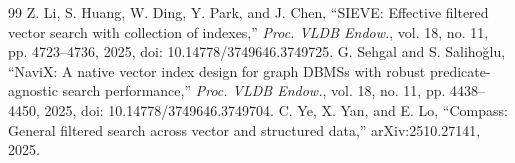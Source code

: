 \documentclass[conference]{IEEEtran}
\begin{document}
\begin{thebibliography}{99}
 Z. Li, S. Huang, W. Ding, Y. Park, and J. Chen, ``SIEVE: Effective filtered vector search with collection of indexes,'' \emph{Proc. VLDB Endow.}, vol. 18, no. 11, pp. 4723--4736, 2025, doi: 10.14778/3749646.3749725.
 G. Sehgal and S. Saliho\u{g}lu, ``NaviX: A native vector index design for graph DBMSs with robust predicate-agnostic search performance,'' \emph{Proc. VLDB Endow.}, vol. 18, no. 11, pp. 4438--4450, 2025, doi: 10.14778/3749646.3749704.
 C. Ye, X. Yan, and E. Lo, ``Compass: General filtered search across vector and structured data,'' arXiv:2510.27141, 2025.
\end{thebibliography}
\end{document}
